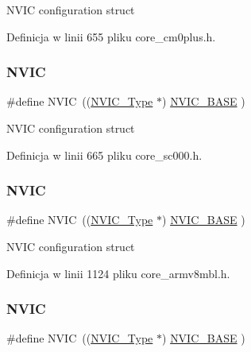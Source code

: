 N\+V\+IC configuration struct 

Definicja w linii 655 pliku core\+\_\+cm0plus.\+h.

\mbox{\label{group___c_m_s_i_s__core__base_gac8e97e8ce56ae9f57da1363a937f8a17}} 
\subsubsection{\texorpdfstring{N\+V\+IC}{NVIC}\hspace{0.1cm}{\footnotesize\ttfamily [4/12]}}
{\footnotesize\ttfamily \#define N\+V\+IC~((\hyperlink{struct_n_v_i_c___type}{N\+V\+I\+C\+\_\+\+Type}      $\ast$)     \hyperlink{group___c_m_s_i_s__core__base_gaa0288691785a5f868238e0468b39523d}{N\+V\+I\+C\+\_\+\+B\+A\+SE}     )}

N\+V\+IC configuration struct 

Definicja w linii 665 pliku core\+\_\+sc000.\+h.

\mbox{\label{group___c_m_s_i_s__core__base_gac8e97e8ce56ae9f57da1363a937f8a17}} 
\subsubsection{\texorpdfstring{N\+V\+IC}{NVIC}\hspace{0.1cm}{\footnotesize\ttfamily [5/12]}}
{\footnotesize\ttfamily \#define N\+V\+IC~((\hyperlink{struct_n_v_i_c___type}{N\+V\+I\+C\+\_\+\+Type}      $\ast$)     \hyperlink{group___c_m_s_i_s__core__base_gaa0288691785a5f868238e0468b39523d}{N\+V\+I\+C\+\_\+\+B\+A\+SE}        )}

N\+V\+IC configuration struct 

Definicja w linii 1124 pliku core\+\_\+armv8mbl.\+h.

\mbox{\label{group___c_m_s_i_s__core__base_gac8e97e8ce56ae9f57da1363a937f8a17}} 
\subsubsection{\texorpdfstring{N\+V\+IC}{NVIC}\hspace{0.1cm}{\footnotesize\ttfamily [6/12]}}
{\footnotesize\ttfamily \#define N\+V\+IC~((\hyperlink{struct_n_v_i_c___type}{N\+V\+I\+C\+\_\+\+Type}      $\ast$)     \hyperlink{group___c_m_s_i_s__core__base_gaa0288691785a5f868238e0468b39523d}{N\+V\+I\+C\+\_\+\+B\+A\+SE}        )}


